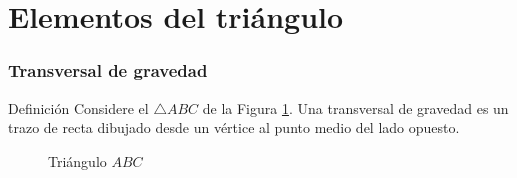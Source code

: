 \documentclass[12pt,spanish,x11names]{beamer}
\title{\talktitle}
\subtitle{\talksubtitle}
\author{\talkauthor}
\institute{\talkaffiliation}
\date{\footnotesize{\emph{\href{\talkblog}{\talkemail}}}}
\begin{document}
\begin{frame}
\titlepage
\end{frame}
\section{Elementos del triángulo}
\begin{frame}
  \frametitle{Transversal de gravedad}
  \begin{block}{Definición}
    Considere el $\triangle ABC$ de la Figura \ref{fig:tg}. Una transversal de gravedad es un trazo de
    recta dibujado desde un vértice al punto medio del lado opuesto.

    \begin{figure}[h]
      \centering
      \caption{Triángulo $ABC$}
      \label{fig:tg}
    \end{figure}
  \end{block}
\end{frame}
\end{document}
